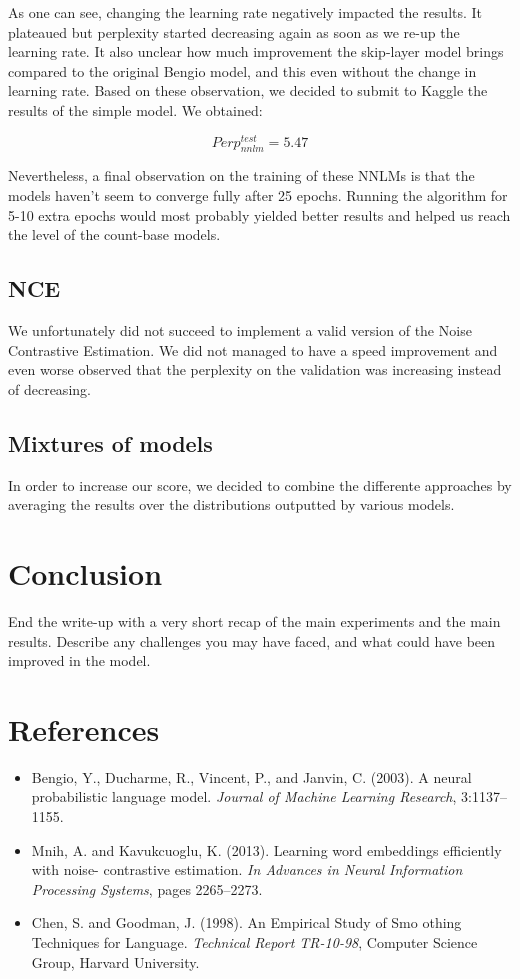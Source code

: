 \documentclass[11pt]{article}
\begin{document}
\noindent As one can see, changing the learning rate negatively impacted the results. It plateaued but perplexity started decreasing again as soon as we re-up the learning rate. It also unclear how much improvement the skip-layer model brings compared to the original Bengio model, and this even without the change in learning rate. Based on these observation, we decided to submit to Kaggle the results of the simple model. We obtained:

$$Perp^{test}_{nnlm} = 5.47$$

\noindent Nevertheless, a final observation on the training of these NNLMs is that the models haven't seem to converge fully after 25 epochs. Running the algorithm for 5-10 extra epochs would most probably yielded better results and helped us reach the level of the count-base models.

\subsection{NCE}

We unfortunately did not succeed to implement a valid version of the Noise Contrastive Estimation. We did not managed to have a speed improvement and even worse observed that the perplexity on the validation was increasing instead of decreasing.

\subsection{Mixtures of models}
In order to increase our score, we decided to combine the differente approaches by averaging the results over the distributions outputted by various models.

\section{Conclusion}

End the write-up with a very short recap of the main experiments and the main results. Describe any challenges you may have faced, and what could have been improved in the model.

\section{References}
\begin{itemize}
\item Bengio, Y., Ducharme, R., Vincent, P., and Janvin, C. (2003). A neural probabilistic language model. \emph{Journal of Machine Learning Research}, 3:1137–1155.

\item Mnih, A. and Kavukcuoglu, K. (2013). Learning word embeddings efficiently with noise- contrastive estimation. \emph{In Advances in Neural Information Processing Systems}, pages 2265–2273.

\item Chen, S. and Goodman, J. (1998). An Empirical Study of Smo othing Techniques for Language. \emph{Technical Report TR-10-98}, Computer Science Group, Harvard University.
\end{itemize}
\end{document}
